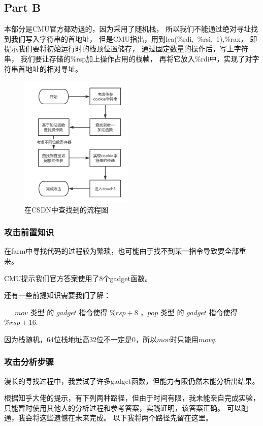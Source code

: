 \subsection{Part B}
    本部分是CMU官方都劝退的，因为采用了随机栈，
    所以我们不能通过绝对寻址找到我们写入字符串的首地址，
    但是CMU指出，用到lea(\%rdi,\ \%rsi,\ 1),\%rax，
    即提示我们要将初始运行时的栈顶位置储存，
    通过固定数量的操作后，写上字符串，
    我们要让存储的\%rsp加上操作占用的栈帧，
    再将它放入\%rdi中，实现了对字符串首地址的相对寻址。

\begin{figure} [H]
    \centering
    \includegraphics[width=0.48\textwidth]{Tip.png}
    \caption{在CSDN中查找到的流程图}
\end{figure}

\subsubsection{攻击前置知识}
在farm中寻找代码的过程较为繁琐，也可能由于找不到某一指令导致要全部重来。

CMU提示我们官方答案使用了8个gadget函数。

还有一些前提知识需要我们了解：

\  \ \ $mov$ 类型 的 $gadget$ 指令使得 $\%rsp+8$ ，$pop$ 类型 的 $gadget$ 指令使得 $\%rsp+16$.

因为栈随机，$64$位栈地址高$32$位不一定是$0$，所以$mov$时只能用$movq$.

\subsubsection{攻击分析步骤}
    漫长的寻找过程中，我尝试了许多gadget函数，但能力有限仍然未能分析出结果。

    根据知乎大佬的提示，有下列两种路径，但由于时间有限，我未能亲自完成实验，只能暂时使用其他人的分析过程和参考答案，实践证明，该答案正确。
    可以跑通，我会将这些遗憾在未来完成。
    以下我将两个路径先留在这里。

